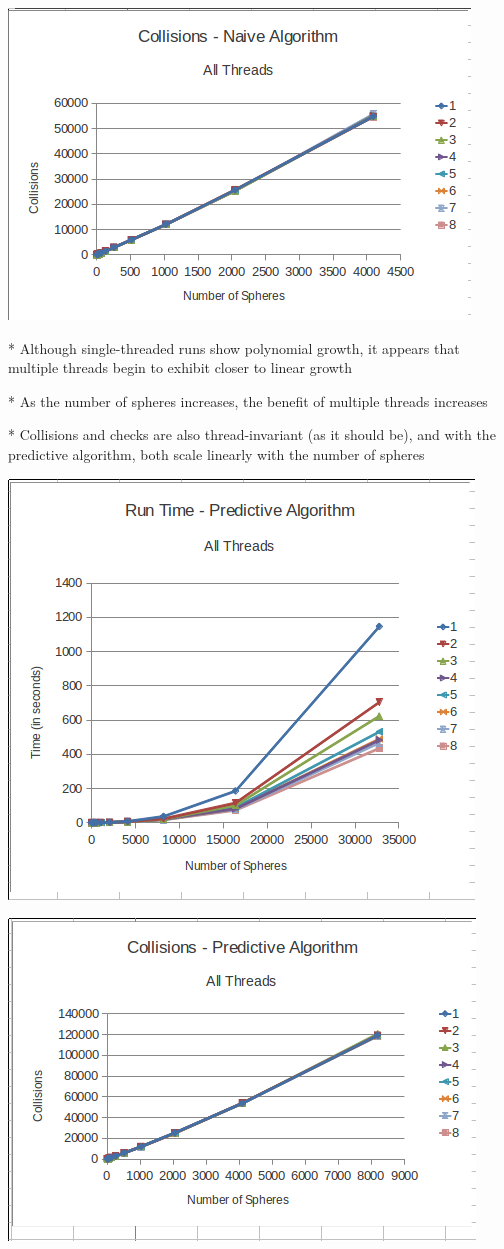 \documentclass[conference]{IEEEtran}
\begin{document}
\begin{center}
	\includegraphics[width=.45\textwidth]{collisions_naive_allthreads.png}
\end{center}

* Although single-threaded runs show polynomial growth, it appears that multiple threads begin to exhibit closer to linear growth

* As the number of spheres increases, the benefit of multiple threads increases

* Collisions and checks are also thread-invariant (as it should be), and with the predictive algorithm, both scale linearly with the number of spheres

\begin{center}
	\includegraphics[width=.45\textwidth]{runtime_predictive_allthreads.png}
\end{center}

\begin{center}
	\includegraphics[width=.45\textwidth]{collisions_predictive_allthreads.png}
\end{center}
\end{document}
